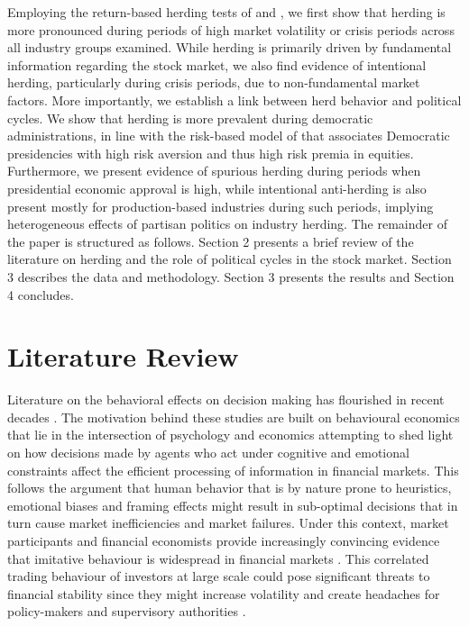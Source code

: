 \documentclass[
  letterpaper,
  DIV=11,
  numbers=noendperiod]{scrartcl}
\begin{document}
Employing the return-based herding tests of
\citet{christie1995following} and \citet{chang2000examination}, we first
show that herding is more pronounced during periods of high market
volatility or crisis periods across all industry groups examined. While
herding is primarily driven by fundamental information regarding the
stock market, we also find evidence of intentional herding, particularly
during crisis periods, due to non-fundamental market factors. More
importantly, we establish a link between herd behavior and political
cycles. We show that herding is more prevalent during democratic
administrations, in line with the risk-based model of
\citet{pastor2020political} that associates Democratic presidencies with
high risk aversion and thus high risk premia in equities. Furthermore,
we present evidence of spurious herding during periods when presidential
economic approval is high, while intentional anti-herding is also
present mostly for production-based industries during such periods,
implying heterogeneous effects of partisan politics on industry herding.
The remainder of the paper is structured as follows. Section 2 presents
a brief review of the literature on herding and the role of political
cycles in the stock market. Section 3 describes the data and
methodology. Section 3 presents the results and Section 4 concludes.

\section{Literature Review}\label{literature-review}

Literature on the behavioral effects on decision making has flourished
in recent decades \citep[for a detailed review
see][]{aggarwal2014animal}. The motivation behind these studies are
built on behavioural economics that lie in the intersection of
psychology and economics attempting to shed light on how decisions made
by agents who act under cognitive and emotional constraints
\citep{mullainathan2000behavioral} affect the efficient processing of
information in financial markets. This follows the argument that human
behavior that is by nature prone to heuristics, emotional biases and
framing effects \citep{aggarwal2014animal} might result in sub-optimal
decisions that in turn cause market inefficiencies and market failures.
Under this context, market participants and financial economists provide
increasingly convincing evidence that imitative behaviour is widespread
in financial markets \citep{devenow1996rational}. This correlated
trading behaviour of investors at large scale could pose significant
threats to financial stability since they might increase volatility and
create headaches for policy-makers and supervisory authorities
\citep{demirer2015commodity}.
\end{document}
